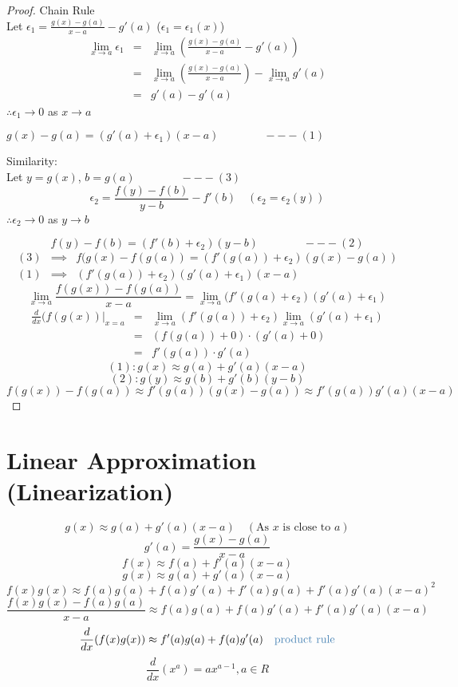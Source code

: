 \begin{proof}
Chain Rule\\
Let $\displaystyle \epsilon_1 = \frac{g(x)-g(a)}{x-a} - g'(a)$ ($\epsilon_1 = \epsilon_1 (x)$)\\
$$\begin{array}{rcl}
\displaystyle \lim_{x \to a} \epsilon_1 & = & \displaystyle \lim_{x \to a} (\frac{g(x)-g(a)}{x-a} -g'(a))\\
& = & \displaystyle  \lim_{x \to a} (\frac{g(x)-g(a)}{x-a}) - \lim_{x \to a} g'(a)\\
& = & \displaystyle g'(a) - g'(a)
\end{array}$$
$\therefore \epsilon_1 \to 0$ as $x \to a$\\
\begin{center}
$g(x) -g(a) = (g'(a) + \epsilon_1)(x - a) \qquad \qquad --- (1)$\\
\end{center}
Similarity:\\
Let $y = g(x)$, $b = g(a) \qquad \qquad --- (3)$\\
$$\displaystyle \epsilon_2 = \frac{f(y) - f(b)}{y-b} - f'(b) \quad (\epsilon_2 = \epsilon_2(y))$$
$\therefore \epsilon_2 \to 0$ as $y \to b$

$$f(y) - f(b) = (f'(b)+\epsilon_2)(y-b) \qquad \qquad --- (2)$$
$$\begin{array}{rcl}
(3) & \implies & f(g(x) - f(g(a)) = (f'(g(a)) + \epsilon_2)(g(x)-g(a))\\
(1) & \implies & (f'(g(a)) + \epsilon_2)(g'(a) + \epsilon_1)(x-a)
\end{array}$$
$$\displaystyle \lim_{x \to a} \frac{f(g(x)) - f(g(a))}{x - a} = \lim_{x \to a} (f'(g(a) + \epsilon_2)(g'(a) + \epsilon_1)$$
$$\begin{array}{rcl}
\displaystyle \frac{d}{dx} (f(g(x)) |_{x=a} & = & \displaystyle \lim_{x \to a} (f'(g(a)) +\epsilon_2) \lim_{x \to a} (g'(a) + \epsilon_1)\\
& = & (f(g(a)) + 0) \cdot (g'(a) + 0)\\
&= & f'(g(a)) \cdot g'(a)
\end{array}$$
$$(1): g(x) \approx g(a)+ g'(a)(x-a)$$
$$(2): g(y) \approx g(b)+g'(b)(y-b)$$
$$f(g(x)) -f(g(a)) \approx f'(g(a))(g(x)-g(a)) \approx f'(g(a)) g'(a)(x-a)$$
\end{proof}

\section{Linear Approximation (Linearization)}
$$g(x) \approx g(a) + g'(a)(x-a) \quad (\text{As } x \text{ is close to } a)$$
$$\displaystyle g'(a) = \frac{g(x)-g(a)}{x-a}$$
$$f(x) \approx f(a) + f'(a)(x-a)$$
$$g(x) \approx g(a) + g'(a)(x-a)$$
$$f(x)g(x) \approx f(a)g(a) + f(a)g'(a) + f'(a)g(a) + f'(a)g'(a)(x-a)^2$$
$$\displaystyle \frac{f(x)g(x) -f(a)g(a)}{x-a} \approx f(a)g(a) +  f(a)g'(a)+f'(a)g'(a)(x-a)$$
$$\displaystyle \frac{d}{dx} (f(x)g(x)) \approx f'(a)g(a) + f(a)g'(a) \quad \text{\tssteelblue{product rule}}$$
$$\displaystyle \frac{d}{dx} (x^a) = ax^{a-1}, a \in R$$


